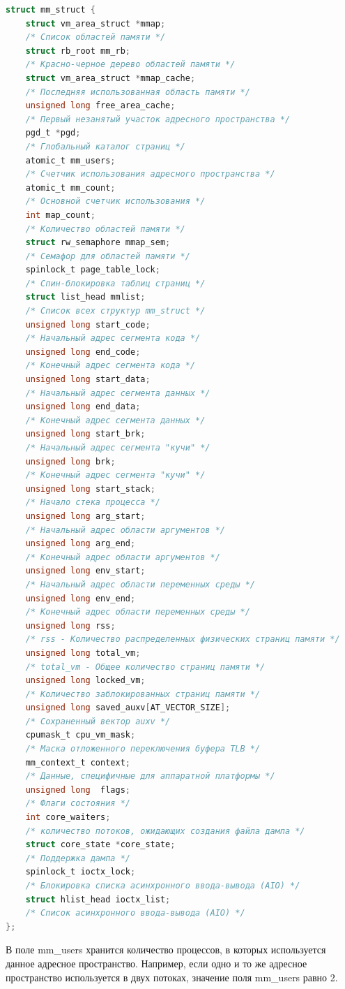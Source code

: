 \begin{lstlisting}[language=c, label=some-code, caption=Структура mm\_struct]
struct mm_struct {
	struct vm_area_struct *mmap; 
	/* Список областей памяти */
	struct rb_root mm_rb; 
	/* Красно-черное дерево областей памяти */
	struct vm_area_struct *mmap_cache;
	/* Последняя использованная область памяти */
	unsigned long free_area_cache; 
	/* Первый незанятый участок адресного пространства */
	pgd_t *pgd;
	/* Глобальный каталог страниц */
	atomic_t mm_users; 
	/* Счетчик использования адресного пространства */
	atomic_t mm_count; 
	/* Основной счетчик использования */
	int map_count; 
	/* Количество областей памяти */
	struct rw_semaphore mmap_sem; 
	/* Семафор для областей памяти */
	spinlock_t page_table_lock; 
	/* Спин-блокировка таблиц страниц */
	struct list_head mmlist;
	/* Список всех структур mm_struct */
	unsigned long start_code;
	/* Начальный адрес сегмента кода */
	unsigned long end_code;
	/* Конечный адрес сегмента кода */
	unsigned long start_data;
	/* Начальный адрес сегмента данных */
	unsigned long end_data;
	/* Конечный адрес сегмента данных */
	unsigned long start_brk;
	/* Начальный адрес сегмента "кучи" */
	unsigned long brk;
	/* Конечный адрес сегмента "кучи" */
	unsigned long start_stack;
	/* Начало стека процесса */
	unsigned long arg_start; 
	/* Начальный адрес области аргументов */
	unsigned long arg_end;
	/* Конечный адрес области аргументов */
	unsigned long env_start; 
	/* Начальный адрес области переменных среды */
	unsigned long env_end;
	/* Конечный адрес области переменных среды */
	unsigned long rss;
	/* rss - Количество распределенных физических страниц памяти */
	unsigned long total_vm; 
	/* total_vm - Общее количество страниц памяти */
	unsigned long locked_vm; 
	/* Количество заблокированных страниц памяти */
	unsigned long saved_auxv[AT_VECTOR_SIZE]; 
	/* Сохраненный вектор auxv */
	cpumask_t cpu_vm_mask;
	/* Маска отложенного переключения буфера TLB */
	mm_context_t context; 
	/* Данные, специфичные для аппаратной платформы */
	unsigned long  flags;
	/* Флаги состояния */
	int core_waiters;
	/* количество потоков, ожидающих создания файла дампа */
	struct core_state *core_state; 
	/* Поддержка дампа */
	spinlock_t ioctx_lock; 
	/* Блокировка списка асинхронного ввода-вывода (AIO) */
	struct hlist_head ioctx_list; 
	/* Список асинхронного ввода-вывода (AIO) */
};
\end{lstlisting}

В поле mm\_users хранится количество процессов, в которых используется данное
адресное пространство. Например, если одно и то же адресное пространство 
используется в двух потоках, значение поля mm\_users равно 2.

